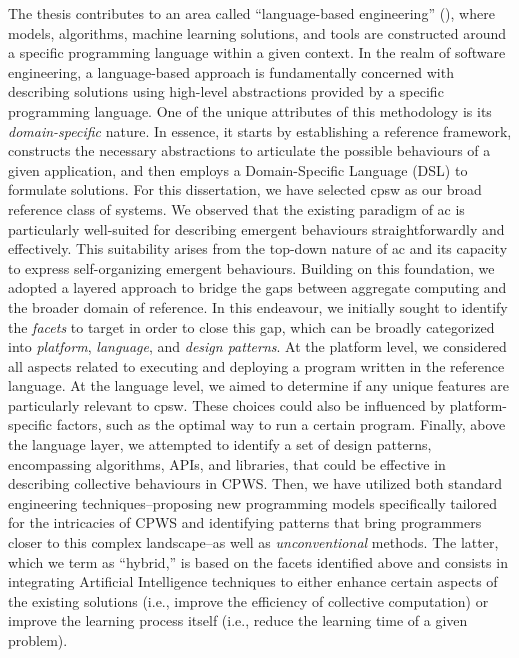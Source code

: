 \begin{refsection}
The thesis contributes to an area called ``language-based engineering'' (), where models, algorithms, machine learning solutions, and tools are constructed around a specific programming language within a given context.
In the realm of software engineering, 
 a language-based approach is fundamentally concerned with describing solutions using high-level abstractions provided by a specific programming language. 
 One of the unique attributes of this methodology is its \emph{domain-specific} nature. 
 In essence, it starts by establishing a reference framework, 
 constructs the necessary abstractions to articulate the possible behaviours of a given application, 
 and then employs a Domain-Specific Language (DSL) to formulate solutions.
%
For this dissertation, 
 we have selected \ac{cpsw} as our broad reference class of systems. 
 We observed that the existing paradigm of \acf{ac} 
 is particularly well-suited for describing emergent behaviours straightforwardly and effectively. This suitability arises from the top-down nature of \ac{ac} and its capacity to express self-organizing emergent behaviours.
%
Building on this foundation, 
 we adopted a layered approach to bridge the gaps between aggregate computing and the broader domain of reference. 
 In this endeavour, 
 we initially sought to identify the \emph{facets} to target in order to close this gap, 
 which can be broadly categorized into \emph{platform}, \emph{language}, and \emph{design patterns}. 
 At the platform level, 
 we considered all aspects related to executing and deploying a program written in the reference language. 
 At the language level, we aimed to determine if any unique features are particularly relevant to \ac{cpsw}. 
 These choices could also be influenced by platform-specific factors, 
 such as the optimal way to run a certain program. 
 Finally, above the language layer, 
 we attempted to identify a set of design patterns, encompassing algorithms, APIs, and libraries, 
 that could be effective in describing collective behaviours in CPWS.
 Then, we have utilized both standard engineering techniques--proposing new programming models specifically tailored for the intricacies of CPWS and identifying patterns that bring programmers closer to this complex landscape--as well as \emph{unconventional} methods. 
 The latter, which we term as ``hybrid,'' 
 is based on the facets identified above and consists in
 integrating Artificial Intelligence techniques 
 to either enhance certain aspects of the existing solutions (i.e., improve the efficiency of collective computation) or improve the learning process itself (i.e., reduce the learning time of a given problem).

\end{refsection}
